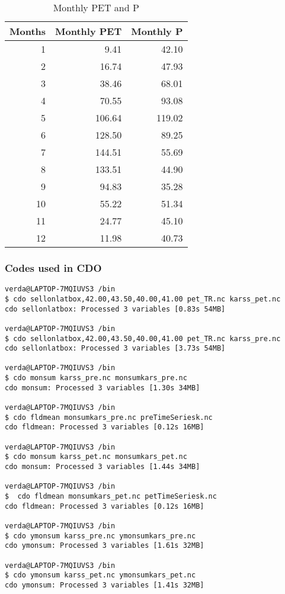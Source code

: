 \documentclass{article}
\begin{document}
\begin{table}[htbp]
  \centering
  \caption{Monthly PET and P}
    \begin{tabular}{rrr}
    \toprule
    Months & Monthly PET & Monthly P \\
    \midrule
    1     & 9.41  & 42.10 \\
    2     & 16.74 & 47.93 \\
    3     & 38.46 & 68.01 \\
    4     & 70.55 & 93.08 \\
    5     & 106.64 & 119.02 \\
    6     & 128.50 & 89.25 \\
    7     & 144.51 & 55.69 \\
    8     & 133.51 & 44.90 \\
    9     & 94.83 & 35.28 \\
    10    & 55.22 & 51.34 \\
    11    & 24.77 & 45.10 \\
    12    & 11.98 & 40.73 \\
    \bottomrule
    \end{tabular}%
  \label{Monthly PET and P Values}%
\end{table}%

\subsubsection{Codes used in CDO}

\begin{verbatim}
verda@LAPTOP-7MQIUVS3 /bin
$ cdo sellonlatbox,42.00,43.50,40.00,41.00 pet_TR.nc karss_pet.nc
cdo sellonlatbox: Processed 3 variables [0.83s 54MB]

verda@LAPTOP-7MQIUVS3 /bin
$ cdo sellonlatbox,42.00,43.50,40.00,41.00 pet_TR.nc karss_pre.nc
cdo sellonlatbox: Processed 3 variables [3.73s 54MB]

verda@LAPTOP-7MQIUVS3 /bin
$ cdo monsum karss_pre.nc monsumkars_pre.nc
cdo monsum: Processed 3 variables [1.30s 34MB]

verda@LAPTOP-7MQIUVS3 /bin
$ cdo fldmean monsumkars_pre.nc preTimeSeriesk.nc
cdo fldmean: Processed 3 variables [0.12s 16MB]

verda@LAPTOP-7MQIUVS3 /bin
$ cdo monsum karss_pet.nc monsumkars_pet.nc
cdo monsum: Processed 3 variables [1.44s 34MB]

verda@LAPTOP-7MQIUVS3 /bin
$  cdo fldmean monsumkars_pet.nc petTimeSeriesk.nc
cdo fldmean: Processed 3 variables [0.12s 16MB]

verda@LAPTOP-7MQIUVS3 /bin
$ cdo ymonsum karss_pre.nc ymonsumkars_pre.nc
cdo ymonsum: Processed 3 variables [1.61s 32MB]

verda@LAPTOP-7MQIUVS3 /bin
$ cdo ymonsum karss_pet.nc ymonsumkars_pet.nc
cdo ymonsum: Processed 3 variables [1.41s 32MB]
\end{verbatim}
\end{document}
